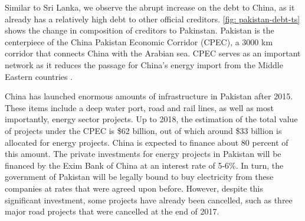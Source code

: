 Similar to Sri Lanka, we observe the abrupt increase on the debt to China, as it already has a relatively high debt to other official creditors. \autoref{fig: pakistan-debt-ts} shows the change in composition of creditors to Pakinstan. 
Pakistan is the centerpiece of the China Pakistan Economic Corridor (CPEC), a 3000 km corridor that connects China with the Arabian sea.
CPEC serves as an important network as it reduces the passage for China's energy import from the Middle Eastern countries \citep*{CPEC-wiki}.

China has launched enormous amounts of infrastructure in Pakistan after 2015. These items include a deep water port, road and rail lines, as well as most importantly, energy sector projects. Up to 2018, the estimation of the total value of projects under the CPEC is \$62 billion, out of which around \$33 billion is allocated for energy projects\citep*{Hurley19-8-debt-trap}. China is expected to finance about 80 percent of this amount. The private investments for energy projects in Pakistan will be financed by the Exim Bank of China at an interest rate of 5-6\%. In turn, the government of Pakistan will be legally bound to buy electricity from these companies at rates that were agreed upon before.
However, despite this significant investment, some projects have already been cancelled, such as three major road projects that were cancelled at the end of 2017\citep*{Hurley19-8-debt-trap}.
